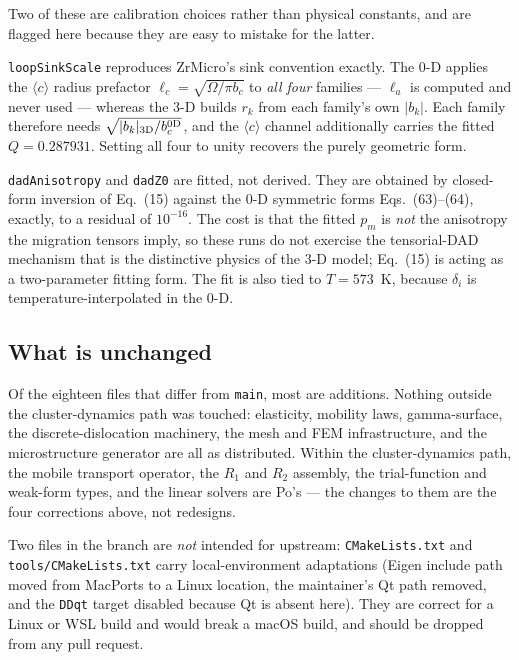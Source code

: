 \documentclass[11pt]{article}
\newcommand{\cloop}{\ensuremath{\langle c\rangle}}
\newcommand{\ZrM}{\textsf{ZrMicro}}
\newcommand{\code}[1]{\texttt{\small #1}}
\newcommand{\file}[1]{\texttt{\footnotesize #1}}
\newcommand{\dref}[1]{Eq.~(#1)}
\newcommand{\drefs}[2]{Eqs.~(#1)--(#2)}
\begin{document}
\noindent
Two of these are calibration choices rather than physical constants, and are
flagged here because they are easy to mistake for the latter.

\code{loopSinkScale} reproduces \ZrM{}'s sink convention exactly. The 0-D applies
the \cloop{} radius prefactor $\ell_c = \sqrt{\Omega/\pi b_c}$ to \emph{all four}
families --- $\ell_a$ is computed and never used --- whereas the 3-D builds
$r_k$ from each family's own $|b_k|$. Each family therefore needs
$\sqrt{|b_k|_{\rm 3D}/b_c^{\rm 0D}}$, and the \cloop{} channel additionally
carries the fitted $Q = 0.287931$. Setting all four to unity recovers the purely
geometric form.

\code{dadAnisotropy} and \code{dadZ0} are fitted, not derived. They are obtained
by closed-form inversion of \dref{15} against the 0-D symmetric forms
\drefs{63}{64}, exactly, to a residual of $10^{-16}$. The cost is that the fitted
$p_m$ is \emph{not} the anisotropy the migration tensors imply, so these runs do
not exercise the tensorial-DAD mechanism that is the distinctive physics of the
3-D model; \dref{15} is acting as a two-parameter fitting form. The fit is also
tied to $T=573$~K, because $\delta_i$ is temperature-interpolated in the 0-D.

\subsection{What is unchanged}

Of the eighteen files that differ from \file{main}, most are additions. Nothing
outside the cluster-dynamics path was touched: elasticity, mobility laws,
gamma-surface, the discrete-dislocation machinery, the mesh and FEM
infrastructure, and the microstructure generator are all as distributed. Within
the cluster-dynamics path, the mobile transport operator, the $R_1$ and $R_2$
assembly, the trial-function and weak-form types, and the linear solvers are
Po's --- the changes to them are the four corrections above, not redesigns.

Two files in the branch are \emph{not} intended for upstream:
\file{CMakeLists.txt} and \file{tools/CMakeLists.txt} carry local-environment
adaptations (Eigen include path moved from MacPorts to a Linux location, the
maintainer's Qt path removed, and the \code{DDqt} target disabled because Qt is
absent here). They are correct for a Linux or WSL build and would break a macOS
build, and should be dropped from any pull request.

\appendix
\end{document}
